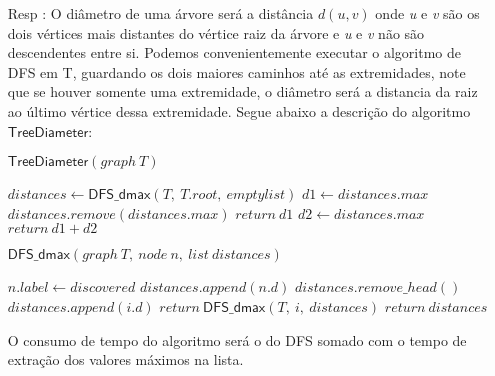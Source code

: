 \documentclass{homework}
\begin{document}
    \begin{enumerate}
        \item[Resp :] O diâmetro de uma árvore será a distância $d(u,v)$ onde \textit{u} e \textit{v} são os dois vértices mais distantes do vértice raiz da árvore e \textit{u} e \textit{v} não são descendentes entre si. Podemos convenientemente executar o algoritmo de DFS em T, guardando os dois maiores caminhos até as extremidades, note que se houver somente uma extremidade, o diâmetro será a distancia da raiz ao último vértice dessa extremidade. Segue abaixo a descrição do algoritmo $\mathsf{TreeDiameter}$:
        
\pagebreak

        $\mathsf{TreeDiameter}(graph\ T)$
			\begin{algorithmic}[1]
			    \State $distances \gets \mathsf{DFS\_dmax}(T,\ T.root,\ emptylist)$
			    \State $d1 \gets distances.max$
			    \State $distances.remove(distances.max)$
			        \State $return\ d1$
			    \EndIf
			    \State $d2 \gets distances.max$
			    \State $return\ d1+d2$
			\end{algorithmic}
		$\mathsf{DFS\_dmax}(graph\ T,\ node\ n,\ list\ distances)$
			\begin{algorithmic}[1]
			    \State $n.label \gets discovered$
			        \State $distances.append(n.d)$
			    \EndIf
			                \State $distances.remove\_head()$
			                \State $distances.append(i.d)$
			            \EndIf
			            \State $return\ \mathsf{DFS\_dmax}(T,\ i,\ distances)$
			        \EndIf
			    \EndFor
			    \State $return\ distances$
			\end{algorithmic}
			O consumo de tempo do algoritmo será o do DFS somado com o tempo de extração dos valores máximos na lista.
    \end{enumerate}
\end{document}
